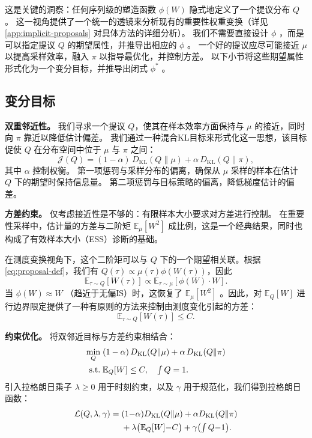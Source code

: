 \documentclass{article}
\theoremstyle{plain}
\theoremstyle{definition}
\theoremstyle{remark}
\begin{document}
这是关键的洞察：任何序列级的塑造函数 $\phi(W)$  隐式地定义了一个提议分布 $Q$ 。  
这一视角提供了一个统一的透镜来分析现有的重要性权重变换（详见 \cref{app:implicit-proposals} 对具体方法的详细分析）。  
我们不需要直接设计 $\phi$ ，而是可以指定提议 $Q$ 的期望属性，并推导出相应的 $\phi$ 。  
一个好的提议应尽可能接近 $\mu$ 以提高采样效率，融入 $\pi$ 以指导最优化，并控制方差。  
以下小节将这些期望属性形式化为一个变分目标，并推导出闭式 $\phi^*$ 。

\subsection{变分目标}
\label{sec:variational-objective}

\textbf{双重邻近性。}
我们寻求一个提议 $Q$，使其在样本效率方面保持与 $\mu$ 的接近，同时向 $\pi$ 靠近以降低估计偏差。
我们通过一种混合KL目标来形式化这一思想，该目标促使 $Q$ 在分布空间中位于 $\mu$ 与 $\pi$ 之间：
\begin{equation}
  \label{eq:dual-kl}
  \mathcal{J}(Q) = (1-\alpha) \, D_{\mathrm{KL}}(Q \| \mu) + \alpha \, D_{\mathrm{KL}}(Q \| \pi),
\end{equation}
其中 $\alpha$ 控制权衡。  
第一项惩罚与采样分布的偏离，确保从 $\mu$ 采样的样本在估计 $Q$ 下的期望时保持信息量。  
第二项惩罚与目标策略的偏离，降低梯度估计的偏差。

\textbf{方差约束。}
仅考虑接近性是不够的：有限样本大小要求对方差进行控制。
在重要性采样中，估计量的方差与二阶矩 $\mathbb{E}_\mu[W^2]$ 成比例，这是一个经典结果，同时也构成了有效样本大小（ESS）诊断的基础。

在测度变换视角下，这个二阶矩可以与 $Q$ 下的一个期望相关联。根据 \cref{eq:proposal-def}，我们有 $Q(\tau) \propto \mu(\tau) \phi(W(\tau))$，因此
\begin{equation}
  \label{eq:variance-link}
  \mathbb{E}_{\tau \sim Q}[W(\tau)] \propto \mathbb{E}_{\tau \sim \mu}[\phi(W) \cdot W].
\end{equation}
当 $\phi(W) \approx W$  （趋近于无偏IS）时，这恢复了 $\mathbb{E}_\mu[W^2]$ 。因此，对 $\mathbb{E}_Q[W]$ 进行边界限定提供了一种有原则的方法来控制由测度变化引起的方差：
\begin{equation}
  \label{eq:moment-constraint}
  \mathbb{E}_{\tau \sim Q}[W(\tau)] \leq C.
\end{equation}

\textbf{约束优化。}
将双邻近目标与方差约束相结合：
\begin{align}
  \label{eq:constrained-opt}
  \min_{Q} \;    & (1-\alpha) \, D_{\mathrm{KL}}(Q \| \mu) + \alpha \, D_{\mathrm{KL}}(Q \| \pi) \notag \\
  \text{s.t.} \; & \mathbb{E}_{Q}[W] \leq C, \quad \textstyle\int Q = 1.
\end{align}
引入拉格朗日乘子 $\lambda \geq 0$ 用于时刻约束，以及 $\gamma$ 用于规范化，我们得到拉格朗日函数：
\begin{align}
  \label{eq:lagrangian}
  \mathcal{L}(Q, \lambda, \gamma) = \; & (1{-}\alpha) D_{\mathrm{KL}}(Q \| \mu) + \alpha D_{\mathrm{KL}}(Q \| \pi) \notag         \\
                                       & + \lambda \bigl(\mathbb{E}_Q[W] {-} C\bigr) + \gamma \bigl(\textstyle\int Q {-} 1\bigr).
\end{align}
\end{document}
